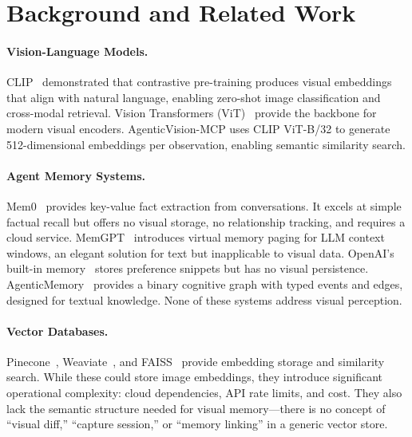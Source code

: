 \documentclass[10pt, twocolumn]{article}
\begin{document}
\section{Background and Related Work}
\label{sec:related}

\paragraph{Vision-Language Models.}
CLIP~\cite{radford2021clip} demonstrated that contrastive pre-training produces visual embeddings that align with natural language, enabling zero-shot image classification and cross-modal retrieval. Vision Transformers (ViT)~\cite{dosovitskiy2020vit} provide the backbone for modern visual encoders. AgenticVision-MCP uses CLIP ViT-B/32 to generate 512-dimensional embeddings per observation, enabling semantic similarity search.

\paragraph{Agent Memory Systems.}
Mem0~\cite{mem0} provides key-value fact extraction from conversations. It excels at simple factual recall but offers no visual storage, no relationship tracking, and requires a cloud service. MemGPT~\cite{packer2023memgpt} introduces virtual memory paging for LLM context windows, an elegant solution for text but inapplicable to visual data. OpenAI's built-in memory~\cite{openai_memory} stores preference snippets but has no visual persistence. AgenticMemory~\cite{owolabi2025agenticmemory} provides a binary cognitive graph with typed events and edges, designed for textual knowledge. None of these systems address visual perception.

\paragraph{Vector Databases.}
Pinecone~\cite{pinecone2024}, Weaviate~\cite{weaviate2024}, and FAISS~\cite{johnson2019faiss} provide embedding storage and similarity search. While these could store image embeddings, they introduce significant operational complexity: cloud dependencies, API rate limits, and cost. They also lack the semantic structure needed for visual memory---there is no concept of ``visual diff,'' ``capture session,'' or ``memory linking'' in a generic vector store.
\end{document}

